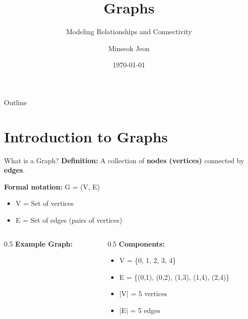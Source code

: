 \documentclass[aspectratio=169]{beamer}
\title{Graphs}
\subtitle{Modeling Relationships and Connectivity}
\author{Minseok Jeon}
\institute{DGIST}
\date{\today}
\begin{document}
\begin{frame}
  \titlepage
\end{frame}

\begin{frame}{Outline}
  \tableofcontents
\end{frame}

\section{Introduction to Graphs}

\begin{frame}{What is a Graph?}
  \textbf{Definition:} A collection of \textbf{nodes (vertices)} connected by \textbf{edges}.

  \vspace{0.3cm}
  \textbf{Formal notation:} G = (V, E)
  \begin{itemize}
    \item V = Set of vertices
    \item E = Set of edges (pairs of vertices)
  \end{itemize}

  \vspace{0.3cm}
  \begin{columns}[T]
    \begin{column}{0.5\textwidth}
      \textbf{Example Graph:}
      \begin{center}
      \end{center}
    \end{column}

    \begin{column}{0.5\textwidth}
      \textbf{Components:}
      \begin{itemize}
        \item V = \{0, 1, 2, 3, 4\}
        \item E = \{(0,1), (0,2), (1,3), (1,4), (2,4)\}
        \item |V| = 5 vertices
        \item |E| = 5 edges
      \end{itemize}
    \end{column}
  \end{columns}
\end{frame}
\end{document}

